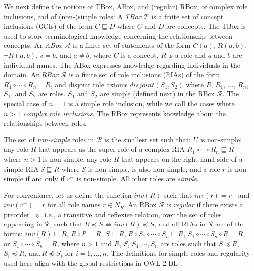 We next define the notions of TBox, ABox, and (regular) RBox, of complex role inclusions, and of (non-)simple roles:
A \emph{TBox} $\mathcal{T}$ is a finite set of concept inclusions (GCIs) of the form $C \sqsubseteq D$ where $C$ and $D$ are concepts. The TBox is used to store terminological knowledge concerning the relationship between concepts. 
%
An \emph{ABox} $\mathcal{A}$ is a finite set of statements of the form $C(a)$, $R(a,b)$, $\lnot R (a,b)$, $a = b$, and $a \not= b$, where $C$ is a concept, $R$ is a role and $a$ and $b$ are individual names. The ABox expresses knowledge regarding individuals in the domain. 
%
An \emph{RBox} $\mathcal{R}$ is a finite set of role inclusions (RIAs) of the form $R_1 \circ \cdots \circ R_n \sqsubseteq R$, and disjoint role axioms $\mathit{disjoint}(S_1, S_2)$ where $R$, $R_1$, $\dots$, $R_n$, $S_1$, and $S_2$ are roles. $S_1$ and $S_2$ are simple (defined next) in the RBox $\mathcal{R}$. The special case of $n = 1$ is a simple role inclusion, while we call the cases where $n > 1$ \emph{complex role inclusions}. The RBox represents knowledge about the relationships between roles.

The set of \emph{non-simple} roles in $\mathcal{R}$ is the smallest set such that: $U$ is non-simple; any role $R$ that appears as the super role of a complex RIA $R_1 \circ \cdots \circ R_n \sqsubseteq R$ where $n > 1$ is non-simple; any role $R$ that appears on the right-hand side of a simple RIA $S \sqsubseteq R$ where $S$ is non-simple, is also non-simple; and a role $r$ is non-simple if and only if $r^-$ is non-simple.
All other roles are \emph{simple}.

For convenience, let us define the function $\mathit{inv}(R)$ such that $\mathit{inv}(r) = r^-$ and $\mathit{inv}(r^-) = r$ for all role names $r \in N_R$. 
An RBox $\mathcal{R}$ is  \emph{regular} if there exists a preorder $\preceq$, i.e., a transitive and reflexive relation, over the set of roles appearing in $\mathcal{R}$, such that $R \preceq S \iff \mathit{inv}(R) \preceq S$, and all RIAs in $\mathcal{R}$ are of the forms:
$\mathit{inv}(R) \sqsubseteq R$,
$R \circ R \sqsubseteq R$,
$S \sqsubseteq R$, $R \circ S_1 \circ \cdots \circ S_n \sqsubseteq R$,
$S_1 \circ \cdots \circ S_n \circ R \sqsubseteq R$, or
$S_1 \circ \cdots \circ S_n \sqsubseteq R$,
where $n > 1$ and $R$, $S$, $S_1, \cdots, S_n$ are roles such that $S \preceq R$, $S_i \preceq R$, and $R \not\preceq S_i$ for $i = 1, \dots, n$. The definitions for simple roles and regularity used here align with the global restrictions in OWL 2 DL \cite{motik2012ontology}.

